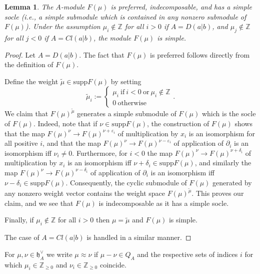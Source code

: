 \documentclass[12pt]{amsart}
\theoremstyle{plain} %
\numberwithin{equation}{section}
\theoremstyle{definition}
\theoremstyle{remark}
\theoremstyle{plain} %
\newtheorem{lemma}[definition]{Lemma}
\newcommand{\supp}{\mathrm{supp}}
\newcommand{\gh}{\mathfrak{h}}
\def\gh{\mathfrak{h}}
\begin{document}
\begin{lemma}\label{indecomposable} The $A$-module $F(\mu)$  is preferred, indecomposable, and has a simple socle (i.e., a simple submodule which is contained in any
  nonzero submodule of $F(\mu)$). Under the assumption  $\mu_i\notin \mathbb Z$ for all $i>0$ if $A=D(a|b)$, and $\mu_j\notin \mathbb Z$ for all $j<0$ if $A=Cl(a|b)$, the module $F(\mu)$ is simple.
\end{lemma}
\begin{proof} 

Let $A=D(a|b)$. The fact that $F(\mu)$  is preferred follows directly from the definition of  $F(\mu)$.

Define the weight $\tilde{\mu} \in\supp F(\mu)$ by setting
  $$\tilde{\mu}_i:=\begin{cases}\mu_i\ \text{if}\ i<0\ \text {or}\ \mu_i\not\in\mathbb Z\\ 0\ \text{otherwise} \end{cases}.$$
  We claim that $F(\mu)^{\tilde{\mu}}$ generates a  simple submodule of $F(\mu)$ which is the socle of  $F(\mu)$. Indeed, note that if $\nu \in\supp F(\mu)$, the construction of $F(\mu)$
  shows that  the map $F(\mu)^\nu\to F(\mu)^{\nu+\varepsilon_i}$  of multiplication by $x_i$ is an isomorphism for all positive $i$, and that
  the map $F(\mu)^\nu\to F(\mu)^{\nu-\varepsilon_i}$ of application of  $\partial_i$
  is an isomorphism iff
  $\nu_i\neq 0$. Furthermore, for $i<0$ the map $F(\mu)^\nu\to F(\mu)^{\nu+\delta_i}$ of multiplication by $x_i$ is an isomorphism iff
  $\nu+\delta_i\in \supp F(\mu)$, and similarly  the map $F(\mu)^\nu\to F(\mu)^{\nu-\delta_i}$ of application of  $\partial_i$  is an isomorphism
  iff $\nu-\delta_i\in \supp F(\mu)$. Consequently, the cyclic submodule of $F(\mu)$ generated  by any nonzero weight vector contains the weight space $F(\mu)^{\tilde{\mu}}$.  This proves our claim, and we see that $F(\mu)$ is  indecomposable as it has a simple socle.

  
  Finally, if $\mu_i\notin \mathbb Z$ for all $i>0$ then  $\mu=\tilde\mu$ and  $F(\mu)$ is simple. 
  
  The case of  $A=Cl(a|b)$ is handled in a similar manner. 
  \end{proof}
  
          For $\mu, \nu \in \gh^{\vee}_A$ we write $\mu \approx \nu$ if $\mu - \nu \in Q_A$ and the respective sets of indices $i$ for which $\mu_i \in \mathbb Z_{\geq 0}$ and $\nu_i \in \mathbb Z_{\geq 0}$ coincide. 
\end{document}
